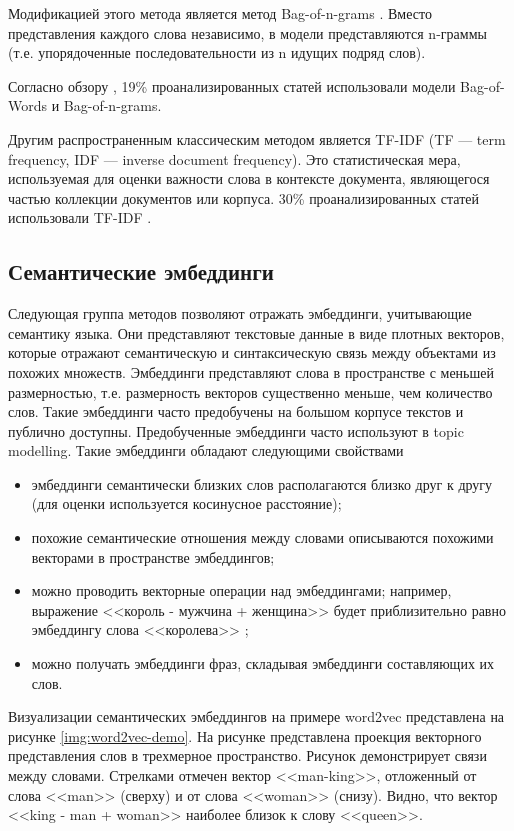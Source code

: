 Модификацией этого метода является метод Bag-of-n-grams \cite{bagofngrams}. Вместо представления каждого слова независимо, в модели представляются n-граммы (т.е. упорядоченные последовательности из n идущих подряд слов).

Согласно обзору \cite{no-patterns}, 19\% проанализированных статей использовали модели Bag-of-Words и Bag-of-n-grams.

Другим распространенным классическим методом является TF-IDF (TF — term frequency, IDF — inverse document frequency). Это статистическая мера, используемая для оценки важности слова в контексте документа, являющегося частью коллекции документов или корпуса. 30\% проанализированных статей использовали TF-IDF \cite{no-patterns}.

\subsection{Семантические эмбеддинги}

Следующая группа методов позволяют отражать эмбеддинги, учитывающие семантику языка. Они представляют текстовые данные в виде плотных векторов, которые отражают семантическую и синтаксическую связь между  объектами из похожих множеств. Эмбеддинги представляют слова в пространстве с меньшей размерностью, т.е. размерность векторов существенно меньше, чем количество слов. Такие эмбеддинги часто предобучены на большом корпусе текстов и публично доступны. Предобученные эмбеддинги часто используют в  topic modelling. Такие эмбеддинги обладают следующими свойствами
\begin{itemize}
    \item эмбеддинги семантически близких слов располагаются близко друг к другу (для оценки используется косинусное расстояние);
    \item похожие семантические отношения между словами описываются похожими векторами в пространстве эмбеддингов;
    \item можно проводить векторные операции над эмбеддингами; например, выражение <<король - мужчина + женщина>> будет приблизительно равно эмбеддингу слова <<королева>> \cite{word2vec};
    \item можно получать эмбеддинги фраз, складывая эмбеддинги составляющих их слов.
\end{itemize}

Визуализации семантических эмбеддингов на примере word2vec представлена на рисунке \ref{img:word2vec-demo}. На рисунке представлена проекция векторного представления слов в трехмерное пространство. Рисунок демонстрирует связи между словами. Стрелками отмечен вектор <<man-king>>, отложенный от слова <<man>> (сверху) и от слова <<woman>> (снизу). Видно, что вектор <<king - man + woman>> наиболее близок к слову <<queen>>.

